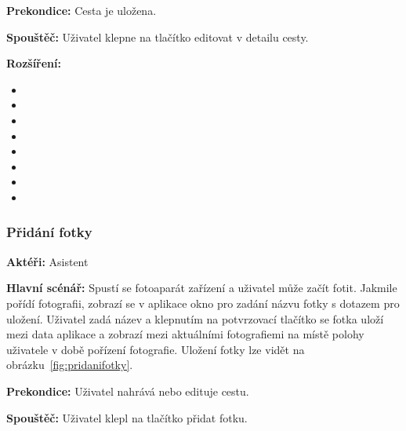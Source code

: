 \documentclass[czech,master,public,dept460,male,java,cpdeclaration]{diploma}
\newcommand{\usecase}[2]{\subsubsection{#1}\label{#2}}
\begin{document}
\vspace{0.1cm}
\noindent
\textbf{Prekondice:} Cesta je uložena.

\vspace{0.1cm}
\noindent
\textbf{Spouštěč:} Uživatel klepne na tlačítko editovat v detailu cesty.

\vspace{0.1cm}
\noindent
\textbf{Rozšíření:}
\begin{itemize}
  \item {}
  \item {}
  \item {}
  \item {}
    \item {}
    \item {}
    \item {}
    \item {}
\end{itemize}

\usecase{Přidání fotky}{pridanifotky}
\textbf{Aktéři:} Asistent

\vspace{0.1cm}
\noindent
\textbf{Hlavní scénář:} Spustí se fotoaparát zařízení a uživatel může začít fotit. Jakmile pořídí
fotografii, zobrazí se v aplikace okno pro zadání názvu fotky s dotazem pro uložení. Uživatel zadá název
a klepnutím na potvrzovací tlačítko se fotka uloží mezi data aplikace a zobrazí mezi aktuálními fotografiemi
na místě polohy uživatele v době pořízení fotografie. Uložení fotky lze vidět na obrázku~\ref{fig:pridanifotky}.

\vspace{0.1cm}
\noindent
\textbf{Prekondice:} Uživatel nahrává nebo edituje cestu.

\vspace{0.1cm}
\noindent
\textbf{Spouštěč:} Uživatel klepl na tlačítko přidat fotku.
\end{document}
